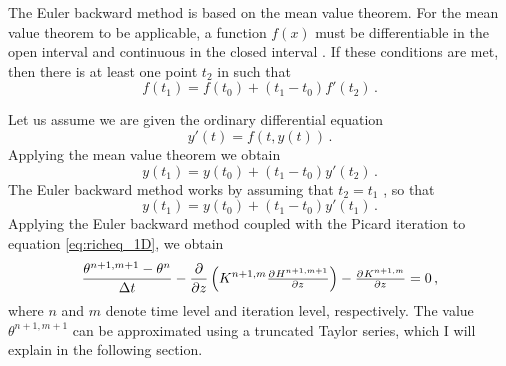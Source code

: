 The Euler backward method is based on the mean value theorem.  For the mean value theorem to be applicable, a function $f(x)$ must be differentiable in the open interval  and continuous in the closed interval  \parencite{Weisstein2017c}.  If these conditions are met, then there is at least one point $t_2$ in  such that
\begin{equation*}
  f(t_1) = f(t_0) + (t_1 - t_0) f'(t_2) \, .
\end{equation*}

Let us assume we are given the ordinary differential equation
\begin{equation*}
  y'(t) = f(t, y(t)) \, .
\end{equation*}
Applying the mean value theorem we obtain
\begin{equation*}
  y(t_1) = y(t_0) + (t_1 - t_0) y'(t_2) \, .
\end{equation*}
The Euler backward method works by assuming that $t_2 = t_1$ \parencite{hairer_solving_2009}, so that
\begin{equation*}
  y(t_1) = y(t_0) + (t_1 - t_0) y'(t_1) \, .
\end{equation*}
Applying the Euler backward method coupled with the Picard iteration to equation \eqref{eq:richeq_1D}, we obtain \parencite{celia_general_1990}
\begin{equation}
  \label{eq:celia_14}
  \frac{\theta^{n+1,m+1} - \theta^n}{\Delta t} - \frac{\partial}{\partial z} \del{ K^{n+1,m}\pd{H^{n+1,m+1}}{z} } - \pd{K^{n+1,m}}{z} = 0 \, ,
\end{equation}
where $n$ and $m$ denote time level and iteration level, respectively.  The value $\theta^{n+1,m+1}$ can be approximated using a truncated Taylor series, which I will explain in the following section.


